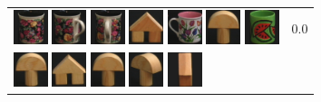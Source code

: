 {\begin{figure}[p]
\begin{tabular}{m{11cm} | m{3cm} |}
\includegraphics[width=1cm]{coil/beeld-62.eps}
\includegraphics[width=1cm]{coil/beeld-64.eps}
\includegraphics[width=1cm]{coil/beeld-65.eps}
\includegraphics[width=1cm]{coil/beeld-43.eps}
\includegraphics[width=1cm]{coil/beeld-7.eps}
\includegraphics[width=1cm]{coil/beeld-1.eps}
\includegraphics[width=1cm]{coil/beeld-32.eps}
& {\scriptsize 0.0}
\\
\includegraphics[width=1cm]{coil/beeld-0.eps}
\includegraphics[width=1cm]{coil/beeld-42.eps}
\includegraphics[width=1cm]{coil/beeld-1.eps}
\includegraphics[width=1cm]{coil/beeld-4.eps}
\includegraphics[width=1cm]{coil/beeld-44.eps}

\end{tabular}
\end{figure}}
